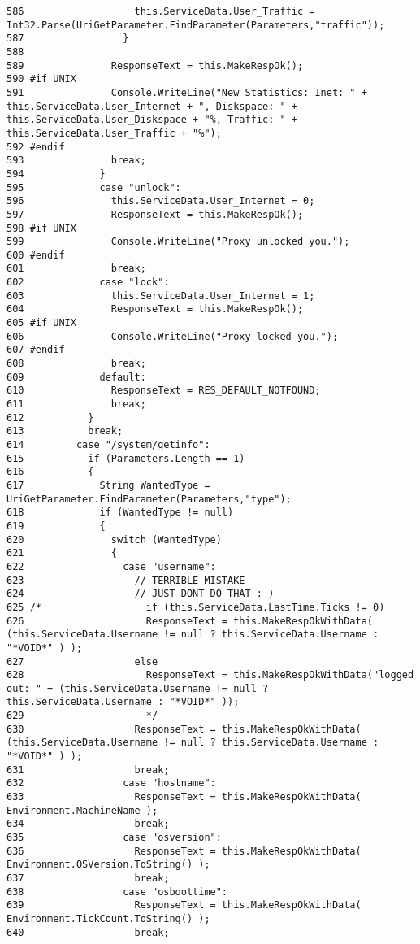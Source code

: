 \begin{verbatim}
586                   this.ServiceData.User_Traffic = Int32.Parse(UriGetParameter.FindParameter(Parameters,"traffic"));
587                 }
588               
589               ResponseText = this.MakeRespOk();
590 #if UNIX
591               Console.WriteLine("New Statistics: Inet: " + this.ServiceData.User_Internet + ", Diskspace: " + this.ServiceData.User_Diskspace + "%, Traffic: " + this.ServiceData.User_Traffic + "%");
592 #endif
593               break;
594             }
595             case "unlock":
596               this.ServiceData.User_Internet = 0;
597               ResponseText = this.MakeRespOk();
598 #if UNIX
599               Console.WriteLine("Proxy unlocked you.");
600 #endif
601               break;
602             case "lock":
603               this.ServiceData.User_Internet = 1;
604               ResponseText = this.MakeRespOk();
605 #if UNIX
606               Console.WriteLine("Proxy locked you.");
607 #endif
608               break;
609             default:
610               ResponseText = RES_DEFAULT_NOTFOUND;
611               break;
612           }
613           break;
614         case "/system/getinfo":
615           if (Parameters.Length == 1)
616           {
617             String WantedType = UriGetParameter.FindParameter(Parameters,"type");
618             if (WantedType != null)
619             {
620               switch (WantedType)
621               {
622                 case "username":
623                   // TERRIBLE MISTAKE
624                   // JUST DONT DO THAT :-)
625 /*                  if (this.ServiceData.LastTime.Ticks != 0)
626                     ResponseText = this.MakeRespOkWithData( (this.ServiceData.Username != null ? this.ServiceData.Username : "*VOID*" ) );
627                   else
628                     ResponseText = this.MakeRespOkWithData("logged out: " + (this.ServiceData.Username != null ? this.ServiceData.Username : "*VOID*" ));
629                     */
630                   ResponseText = this.MakeRespOkWithData( (this.ServiceData.Username != null ? this.ServiceData.Username : "*VOID*" ) );
631                   break;
632                 case "hostname":
633                   ResponseText = this.MakeRespOkWithData( Environment.MachineName );
634                   break;
635                 case "osversion":
636                   ResponseText = this.MakeRespOkWithData( Environment.OSVersion.ToString() );
637                   break;
638                 case "osboottime":
639                   ResponseText = this.MakeRespOkWithData( Environment.TickCount.ToString() );
640                   break;

\end{verbatim}
